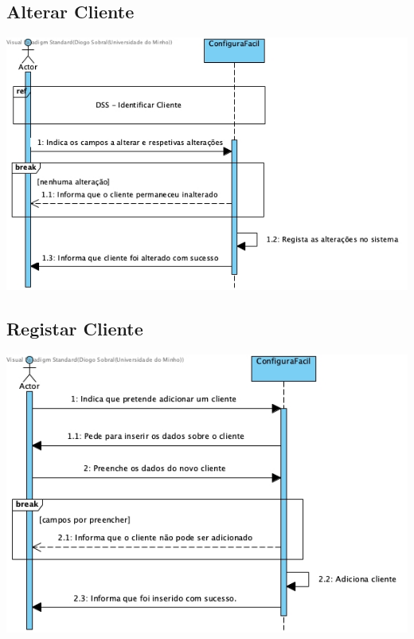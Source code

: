 \subsection{Alterar Cliente}
\begin{center}
 	\includegraphics[width = 5.5in]{DSS/DSS-Alterar_Cliente.jpg}
\end{center}

\subsection{Registar Cliente}
\begin{center}
 	\includegraphics[width = 5.5in]{DSS/DSS-Registar_cliente.jpg}
\end{center}

